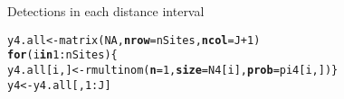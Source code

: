\documentclass[color=usenames,dvipsnames]{beamer}\usepackage[]{graphicx}\usepackage[]{xcolor}
\makeatletter
\newcommand{\hlnum}[1]{\textcolor[rgb]{0.69,0.494,0}{#1}}%
\newcommand{\hlopt}[1]{\textcolor[rgb]{0,0,0}{#1}}%
\newcommand{\hldef}[1]{\textcolor[rgb]{0,0,0}{#1}}%
\newcommand{\hlkwa}[1]{\textcolor[rgb]{0,0,0}{\textbf{#1}}}%
\newcommand{\hlkwb}[1]{\textcolor[rgb]{0,0.341,0.682}{#1}}%
\newcommand{\hlkwc}[1]{\textcolor[rgb]{0,0,0}{\textbf{#1}}}%
\newcommand{\hlkwd}[1]{\textcolor[rgb]{0.004,0.004,0.506}{#1}}%
\newenvironment{kframe}{%
 \def\at@end@of@kframe{}%
 \ifinner\ifhmode%
  \def\at@end@of@kframe{\end{minipage}}%
  \begin{minipage}{\columnwidth}%
 \fi\fi%
 \def\FrameCommand##1{\hskip\@totalleftmargin \hskip-\fboxsep
 \colorbox{shadecolor}{##1}\hskip-\fboxsep
     \hskip-\linewidth \hskip-\@totalleftmargin \hskip\columnwidth}%
 \MakeFramed {\advance\hsize-\width
   \@totalleftmargin\z@ \linewidth\hsize
   \@setminipage}}%
 {\par\unskip\endMakeFramed%
 \at@end@of@kframe}
\newenvironment{knitrout}{}{} %
\makeatother
\begin{document}
\begin{frame}[fragile]
  \pause
  \vfill
  Detections in each distance interval
  \vspace{-6pt}
\begin{knitrout}\scriptsize
{}\color{fgcolor}\begin{kframe}
\begin{alltt}
\hldef{y4.all} \hlkwb{<-} \hlkwd{matrix}\hldef{(}\hlnum{NA}\hldef{,} \hlkwc{nrow}\hldef{=nSites,} \hlkwc{ncol}\hldef{=J}\hlopt{+}\hlnum{1}\hldef{)}
\hlkwa{for}\hldef{(i} \hlkwa{in} \hlnum{1}\hlopt{:}\hldef{nSites) \{}
    \hldef{y4.all[i,]} \hlkwb{<-} \hlkwd{rmultinom}\hldef{(}\hlkwc{n}\hldef{=}\hlnum{1}\hldef{,} \hlkwc{size}\hldef{=N4[i],} \hlkwc{prob}\hldef{=pi4[i,])    \}}
\hldef{y4} \hlkwb{<-} \hldef{y4.all[,}\hlnum{1}\hlopt{:}\hldef{J]}
\end{alltt}
\end{kframe}
\end{knitrout}
\end{frame}
\end{document}
